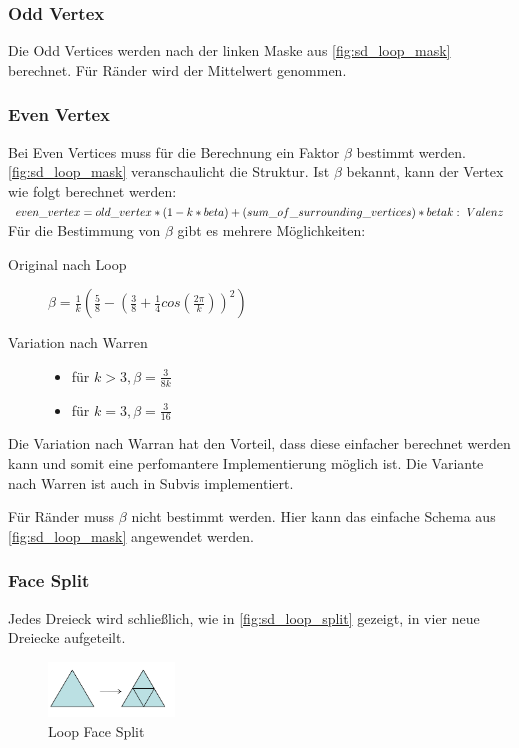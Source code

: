 \subsubsection*{Odd Vertex}
Die Odd Vertices werden nach der linken Maske aus \autoref{fig:sd_loop_mask} berechnet.
Für Ränder wird der Mittelwert genommen.

\subsubsection*{Even Vertex}

Bei Even Vertices muss für die Berechnung ein Faktor \(\beta\) bestimmt werden.
\autoref{fig:sd_loop_mask} veranschaulicht die Struktur.
Ist \(\beta\) bekannt, kann der Vertex wie folgt berechnet werden:\\
\(
even\_vertex = old\_vertex * (1 - k * beta) + (sum\_of\_surrounding\_vertices) * beta\\
k:\ Valenz
\)
\\
Für die Bestimmung von \(\beta\) gibt es mehrere Möglichkeiten:
\begin{description}
\item[Original nach Loop]  \(\beta=\frac{1}{k}(\frac{5}{8}-(\frac{3}{8}+\frac{1}{4}cos(\frac{2\pi}{k}))^2)\)
\item[Variation nach Warren] \mbox{}
	\begin{itemize}
		\item für \(k > 3, \beta = \frac{3}{8k}\)
		\item für \(k = 3, \beta = \frac{3}{16}\)	
	\end{itemize}
\end{description}
Die Variation nach Warran hat den Vorteil, dass diese einfacher berechnet werden kann
und somit eine perfomantere Implementierung möglich ist.
Die Variante nach Warren ist auch in Subvis implementiert.

Für Ränder muss \(\beta\) nicht bestimmt werden.
Hier kann das einfache Schema aus \autoref{fig:sd_loop_mask} angewendet werden.
\cite{Carnegie}
\cite{Standford.Loop}
\cite[S. 70f]{Zorin.subdivcourse}

\subsubsection*{Face Split}

Jedes Dreieck wird schließlich, wie in \autoref{fig:sd_loop_split} gezeigt, in vier neue Dreiecke aufgeteilt.

\begin{figure}
\centering
\includegraphics[width=0.3\textwidth]{content/media/sd_loop_split.png}
\caption{Loop Face Split \cite[S. 56f]{Standford.24.07.2015}}
\label{fig:sd_loop_split}
\end{figure}

